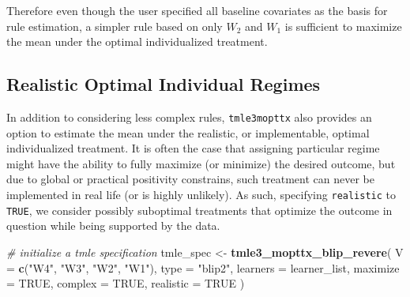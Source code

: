 \documentclass[12pt, krantz2,]{book}
\newenvironment{Shaded}{\begin{snugshade}}{\end{snugshade}}
\newcommand{\CommentTok}[1]{\textcolor[rgb]{0.56,0.35,0.01}{\textit{#1}}}
\newcommand{\DataTypeTok}[1]{\textcolor[rgb]{0.13,0.29,0.53}{#1}}
\newcommand{\KeywordTok}[1]{\textcolor[rgb]{0.13,0.29,0.53}{\textbf{#1}}}
\newcommand{\NormalTok}[1]{#1}
\newcommand{\OperatorTok}[1]{\textcolor[rgb]{0.81,0.36,0.00}{\textbf{#1}}}
\newcommand{\OtherTok}[1]{\textcolor[rgb]{0.56,0.35,0.01}{#1}}
\newcommand{\StringTok}[1]{\textcolor[rgb]{0.31,0.60,0.02}{#1}}
\theoremstyle{definition}
\theoremstyle{definition}
\theoremstyle{definition}
\newcommand{\1}{\mathbbm{1}}
\begin{document}
Therefore even though the user specified all baseline covariates as the basis
for rule estimation, a simpler rule based on only \(W_2\) and \(W_1\) is sufficient
to maximize the mean under the optimal individualized treatment.

\hypertarget{realistic-optimal-individual-regimes}{%
\subsection{Realistic Optimal Individual Regimes}\label{realistic-optimal-individual-regimes}}

In addition to considering less complex rules, \texttt{tmle3mopttx} also provides an
option to estimate the mean under the realistic, or implementable, optimal
individualized treatment. It is often the case that assigning particular regime
might have the ability to fully maximize (or minimize) the desired outcome, but
due to global or practical positivity constrains, such treatment can never be
implemented in real life (or is highly unlikely). As such, specifying
\texttt{realistic} to \texttt{TRUE}, we consider possibly suboptimal treatments that optimize
the outcome in question while being supported by the data.

\begin{Shaded}
\begin{Highlighting}[]
\CommentTok{# initialize a tmle specification}
\NormalTok{tmle_spec <-}\StringTok{ }\KeywordTok{tmle3_mopttx_blip_revere}\NormalTok{(}
  \DataTypeTok{V =} \KeywordTok{c}\NormalTok{(}\StringTok{"W4"}\NormalTok{, }\StringTok{"W3"}\NormalTok{, }\StringTok{"W2"}\NormalTok{, }\StringTok{"W1"}\NormalTok{), }\DataTypeTok{type =} \StringTok{"blip2"}\NormalTok{,}
  \DataTypeTok{learners =}\NormalTok{ learner_list,}
  \DataTypeTok{maximize =} \OtherTok{TRUE}\NormalTok{, }\DataTypeTok{complex =} \OtherTok{TRUE}\NormalTok{, }\DataTypeTok{realistic =} \OtherTok{TRUE}
\NormalTok{)}
\end{Highlighting}
\end{Shaded}

\begin{Shaded}
\end{Shaded}
\end{document}
